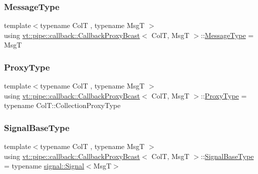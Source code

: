 \subsubsection{\texorpdfstring{Message\+Type}{MessageType}}
{\footnotesize\ttfamily template$<$typename ColT , typename MsgT $>$ \\
using \hyperlink{structvt_1_1pipe_1_1callback_1_1_callback_proxy_bcast}{vt\+::pipe\+::callback\+::\+Callback\+Proxy\+Bcast}$<$ ColT, MsgT $>$\+::\hyperlink{structvt_1_1pipe_1_1callback_1_1_callback_proxy_bcast_ad65703bd011d36432495be4451ea61e7}{Message\+Type} =  MsgT}

\mbox{\label{structvt_1_1pipe_1_1callback_1_1_callback_proxy_bcast_a27c62cb9cbd1dcd3f135dcd98d98c991}} 
\subsubsection{\texorpdfstring{Proxy\+Type}{ProxyType}}
{\footnotesize\ttfamily template$<$typename ColT , typename MsgT $>$ \\
using \hyperlink{structvt_1_1pipe_1_1callback_1_1_callback_proxy_bcast}{vt\+::pipe\+::callback\+::\+Callback\+Proxy\+Bcast}$<$ ColT, MsgT $>$\+::\hyperlink{structvt_1_1pipe_1_1callback_1_1_callback_proxy_bcast_a27c62cb9cbd1dcd3f135dcd98d98c991}{Proxy\+Type} =  typename Col\+T\+::\+Collection\+Proxy\+Type}

\mbox{\label{structvt_1_1pipe_1_1callback_1_1_callback_proxy_bcast_a4ed994346a98d36d5d70c07a3d1e1dfb}} 
\subsubsection{\texorpdfstring{Signal\+Base\+Type}{SignalBaseType}}
{\footnotesize\ttfamily template$<$typename ColT , typename MsgT $>$ \\
using \hyperlink{structvt_1_1pipe_1_1callback_1_1_callback_proxy_bcast}{vt\+::pipe\+::callback\+::\+Callback\+Proxy\+Bcast}$<$ ColT, MsgT $>$\+::\hyperlink{structvt_1_1pipe_1_1callback_1_1_callback_proxy_bcast_a4ed994346a98d36d5d70c07a3d1e1dfb}{Signal\+Base\+Type} =  typename \hyperlink{structvt_1_1pipe_1_1signal_1_1_signal}{signal\+::\+Signal}$<$MsgT$>$}

